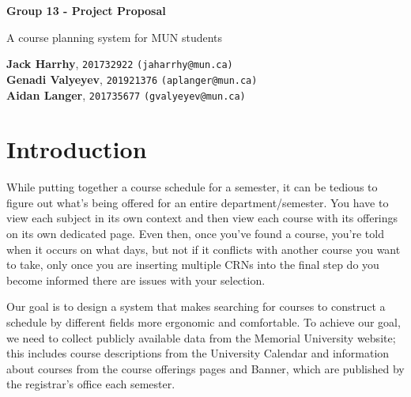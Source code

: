 \documentclass[12pt]{article}
\begin{document}
\begin{titlepage}
    \begin{center}
        \vspace*{1cm}
            
        \Huge
        \textbf{Group 13 - Project Proposal}
            
        \vspace{0.5cm}
        \LARGE
        A course planning system for MUN students
            
        \vspace{1.5cm}
            
        \textbf{Jack Harrhy}, \texttt{201732922} \texttt{(jaharrhy@mun.ca)} \\
        \textbf{Genadi Valyeyev}, \texttt{201921376} \texttt{(aplanger@mun.ca)}\\
        \textbf{Aidan Langer}, \texttt{201735677} \texttt{(gvalyeyev@mun.ca)}\\
            
        \vfill
    \end{center}
\end{titlepage}
\section{Introduction}
While putting together a course schedule for a semester, it can be tedious to figure out what's being offered for an entire department/semester. You have to view each subject in its own context and then view each course with its offerings on its own dedicated page. Even then, once you've found a course, you're told when it occurs on what days, but not if it conflicts with another course you want to take, only once you are inserting multiple CRNs into the final step do you become informed there are issues with your selection. \par
Our goal is to design a system that makes searching for courses to construct a schedule by different fields more ergonomic and comfortable. To achieve our goal, we need to collect publicly available data from the Memorial University website; this includes course descriptions from the University Calendar and information about courses from the course offerings pages and Banner, which are published by the registrar's office each semester.
\end{document}
